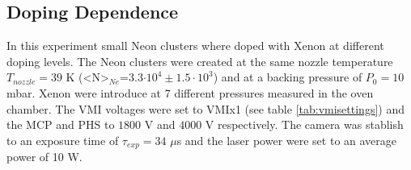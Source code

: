 \subsection{Doping Dependence }

In this experiment small Neon clusters where doped with Xenon at different doping levels. The Neon clusters were created at the same nozzle temperature $T_{nozzle}=39$ K (<N>$_{Ne}$=3.3$\cdot10^{4}\pm 1.5\cdot10^{3}$) and at a backing pressure of $P_{0}=10$ mbar. Xenon were introduce at 7 different pressures measured in the oven chamber. The VMI voltages were set to VMIx1  (see table \ref{tab:vmisettings}) and the MCP and PHS to $1800$ V and $4000$ V respectively. The camera was stablish to an exposure time of $\tau_{exp}=34$ $\mu$s  and the laser power were set to an average power of 10 W.


